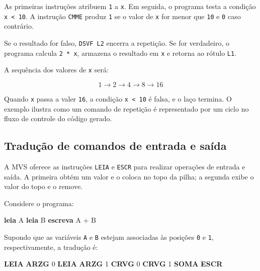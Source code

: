 \documentclass[
  brazilian,
  letterpaper,
]{book}
\newenvironment{Shaded}{\begin{snugshade}}{\end{snugshade}}
\newcommand{\DecValTok}[1]{\textcolor[rgb]{0.68,0.00,0.00}{#1}}
\newcommand{\KeywordTok}[1]{\textcolor[rgb]{0.00,0.23,0.31}{\textbf{#1}}}
\newcommand{\NormalTok}[1]{\textcolor[rgb]{0.00,0.23,0.31}{#1}}
\theoremstyle{plain}
\theoremstyle{definition}
\theoremstyle{remark}
\begin{document}
As primeiras instruções atribuem \texttt{1} a \texttt{x}. Em seguida, o
programa testa a condição \texttt{x\ \textless{}\ 10}. A instrução
\texttt{CMME} produz \texttt{1} se o valor de \texttt{x} for menor que
\texttt{10} e \texttt{0} caso contrário.

Se o resultado for falso, \texttt{DSVF\ L2} encerra a repetição. Se for
verdadeiro, o programa calcula \texttt{2\ *\ x}, armazena o resultado em
\texttt{x} e retorna ao rótulo \texttt{L1}.

A sequência dos valores de \texttt{x} será:

\[
1 \rightarrow 2 \rightarrow 4 \rightarrow 8 \rightarrow 16
\]

Quando \texttt{x} passa a valer \texttt{16}, a condição
\texttt{x\ \textless{}\ 10} é falsa, e o laço termina. O exemplo ilustra
como um comando de repetição é representado por um ciclo no fluxo de
controle do código gerado.

\subsection{Tradução de comandos de entrada e
saída}\label{traduuxe7uxe3o-de-comandos-de-entrada-e-sauxedda}

A MVS oferece as instruções \texttt{LEIA} e \texttt{ESCR} para realizar
operações de entrada e saída. A primeira obtém um valor e o coloca no
topo da pilha; a segunda exibe o valor do topo e o remove.

Considere o programa:

\begin{Shaded}
\begin{Highlighting}[]
\KeywordTok{leia}\NormalTok{ A}
\KeywordTok{leia}\NormalTok{ B}
\KeywordTok{escreva}\NormalTok{ A + B}
\end{Highlighting}
\end{Shaded}

Supondo que as variáveis \texttt{A} e \texttt{B} estejam associadas às
posições \texttt{0} e \texttt{1}, respectivamente, a tradução é:

\begin{Shaded}
\begin{Highlighting}[]
    \KeywordTok{LEIA}
    \KeywordTok{ARZG}  \DecValTok{0}
    \KeywordTok{LEIA}
    \KeywordTok{ARZG}  \DecValTok{1}
    \KeywordTok{CRVG}  \DecValTok{0}
    \KeywordTok{CRVG}  \DecValTok{1}
    \KeywordTok{SOMA}
    \KeywordTok{ESCR}
\end{Highlighting}
\end{Shaded}
\end{document}
